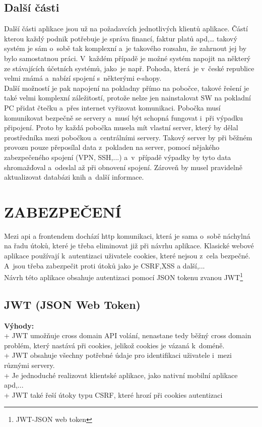 \documentclass[a4paper,12pt,twoside,BCOR=10mm]{article}
\newcommand{\upc}[1]{\uppercase{#1}} %
\renewcommand{\b}[1]{\textbf{#1}} %
\begin{document}
\subsection{Další části}
Další části aplikace jsou už na požadavcích jednotlivých klientů aplikace. Částí kterou každý podnik potřebuje je správa financí, faktur platů apd,… takový systém je sám o~sobě tak komplexní a~je takového rozsahu, že zahrnout jej by bylo samostatnou práci. V~každém případě je možné systém napojit na některý ze stávajících účetních systémů, jako~je např. Pohoda, která~je v~české republice velmi známá a~nabízí spojení s~některými e-shopy.\\
Další možností je pak napojení na pokladny přímo na pobočce, takové řešení je také velmi komplexní záležitostí, protože nelze jen nainstalovat SW na pokladní PC přidat čtečku a~přes internet vyřizovat komunikaci. Pobočka musí komunikovat bezpečně se servery a~musí být schopná fungovat i~při výpadku připojení. Proto by každá pobočka musela mít vlastní server, který by dělal prostředníka mezi pobočkou a~centrálními servery. Takový server by při běžném provozu pouze přeposílal data z~pokladen na server, pomocí nějakého zabezpečeného spojení (VPN, SSH,...) a~v~případě výpadky by tyto data shromažďoval a~odeslal až při obnovení spojení. Zároveň by musel pravidelně aktualizovat databázi knih a~další informace.

\section{\upc{Zabezpečení}}
Mezi api a frontendem dochází http komunikaci, která je sama o~sobě náchylná na řadu útoků, které je třeba eliminovat již při návrhu aplikace. Klasické webové aplikace používají k~autentizaci uživatele cookies, které nejsou z~cela bezpečné. A~jsou třeba zabezpečit proti útoků jako je CSRF,XSS a další,...\\
Návrh této aplikace obsahuje autentizaci pomocí JSON tokenu zvanou JWT\footnote{JWT-JSON web token}\cite{JWT}

\subsection{JWT (JSON Web Token)}
\b{Výhody:}\\
 + JWT umožňuje cross domain API volání, nenastane tedy běžný cross domain problém, který nastává při cookies, jelikož cookies je vázaná k~doméně.\\
 + JWT obsahuje všechny potřebné údaje pro identifikaci uživatele i~mezi různými servery.\\
 + Je jednoduché realizovat klientské aplikace, jako nativní mobilní aplikace apd,...\cite{JWTTut}\\
 + JWT také řeší útoky typu CSRF, které hrozí při cookies autentizaci\\
\end{document}
